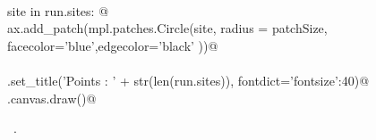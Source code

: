 \documentclass[11.5pt]{report}
\begin{document}
\begin{flushleft}
\begin{list}{}{}
\mbox{}\verb@@\\
\mbox{}\verb@for site in run.sites:      @\\
\mbox{}\verb@    ax.add_patch(mpl.patches.Circle(site, radius = patchSize, \@\\
\mbox{}\verb@                 facecolor='blue',edgecolor='black' ))@\\
\mbox{}\verb@@\\
\mbox{}\verb@ax.set_title('Points : ' + str(len(run.sites)), fontdict={'fontsize':40})@\\
\mbox{}\verb@fig.canvas.draw()@\\
\mbox{}\verb@@{\NWsep}
\end{list}
\vspace{-1.5ex}
\footnotesize
\begin{list}{}{\setlength{\itemsep}{-\parsep}\setlength{\itemindent}{-\leftmargin}}
\item \NWtxtMacroRefIn\ .

\item{}
\end{list}
\vspace{4ex}
\end{flushleft}
\vspace{-0.8cm}\newchunk 
\end{document}
